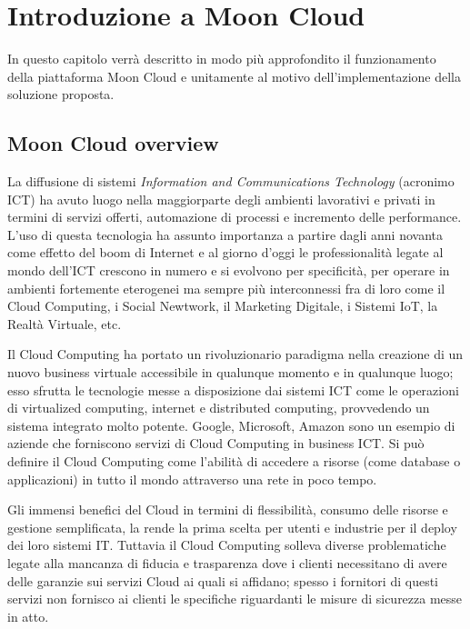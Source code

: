 \chapter{Introduzione a Moon Cloud}
In questo capitolo verrà descritto in modo più approfondito il funzionamento della piattaforma Moon Cloud e unitamente al 
motivo dell'implementazione della soluzione proposta.

\section{Moon Cloud overview}
La diffusione di sistemi \textit{Information and Communications Technology} (acronimo ICT) ha avuto luogo nella maggiorparte degli ambienti 
lavorativi e privati in termini di servizi offerti, automazione di processi e incremento delle performance. L'uso di questa tecnologia 
ha assunto importanza a partire dagli anni novanta come effetto del boom di Internet e al giorno d'oggi le professionalità legate al
mondo dell'ICT crescono in numero e si evolvono per specificità, per operare in ambienti fortemente eterogenei ma sempre più 
interconnessi fra di loro come il Cloud Computing, i Social Newtwork, il Marketing Digitale, i Sistemi IoT, la Realtà Virtuale, etc.

Il Cloud Computing ha portato un rivoluzionario paradigma nella creazione di un nuovo business virtuale accessibile in qualunque momento
e in qualunque luogo; esso sfrutta le tecnologie messe a disposizione dai sistemi ICT come le operazioni di virtualized computing,
internet e distributed computing, provvedendo un sistema integrato molto potente. Google, Microsoft, Amazon sono un esempio di 
aziende che forniscono servizi di Cloud Computing in business ICT. Si può definire il Cloud Computing come l'abilità di accedere a 
risorse (come database o applicazioni) in tutto il mondo attraverso una rete in poco tempo.

Gli immensi benefici del Cloud in termini di flessibilità, consumo delle risorse e gestione semplificata, la rende la prima scelta per 
utenti e industrie per il deploy dei loro sistemi IT. Tuttavia il Cloud Computing solleva diverse problematiche legate alla mancanza di 
fiducia e trasparenza dove i clienti necessitano di avere delle garanzie sui servizi Cloud ai quali si affidano; spesso i fornitori di 
questi servizi non fornisco ai clienti le specifiche riguardanti le misure di sicurezza messe in atto.

